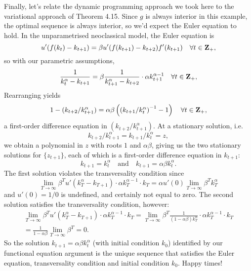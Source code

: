 \documentclass[11pt,letterpaper,reqno,oneside]{article}
\begin{document}
Finally, let's relate the dynamic programming approach we took here to the variational approach of Theorem 4.15. Since $g$ is always interior in this example, the optimal sequence is always interior, so we'd expect the Euler equation to hold. In the unparametrised neoclassical model, the Euler equation is
%
\begin{equation*}
	u'( f(k_t) - k_{t+1} ) 
	= \beta u'( f(k_{t+1}) - k_{t+2} ) f'(k_{t+1})
	\quad\forall t \in \mathbf{Z}_+ ,
\end{equation*}
%
so with our parametric assumptions,
%
\begin{equation*}
	\frac{1}{ k_t^\alpha - k_{t+1} }
	= \beta \frac{1}{ k_{t+1}^\alpha - k_{t+2} } 
	\cdot \alpha k_{t+1}^{\alpha-1}
	\quad\forall t \in \mathbf{Z}_+ ,
\end{equation*}
%
Rearranging yields
%
\begin{equation*}
	1 - (k_{t+2}/k_{t+1}^\alpha) 
	= \alpha \beta \left(
	\left( k_{t+1} / k_t^\alpha \right)^{-1} - 1 \right)
	\quad\forall t \in \mathbf{Z}_+ ,
\end{equation*}
%
a first-order difference equation in $\left( k_{t+2}/k_{t+1}^\alpha \right)$. At a stationary solution, i.e.
%
\begin{equation*}
	k_{t+2}/k_{t+1}^\alpha = k_{t+1} / k_t^\alpha = z ,
\end{equation*}
%
we obtain a polynomial in $z$ with roots $1$ and $\alpha \beta$, giving us the two stationary solutions for $\{z_{t+1}\}$, each of which is a first-order difference equation in $k_{t+1}$:
%
\begin{equation*}
	k_{t+1} = k_t^\alpha
	\quad\text{and}\quad
	k_{t+1} = \alpha \beta k_t^\alpha .
\end{equation*}
%
The first solution violates the transversality condition since
%
\begin{equation*}
	\lim_{T \to \infty} 
	\beta^T u'( k_T^\alpha - k_{T+1} ) 
	\cdot \alpha k_T^{\alpha-1}
	\cdot k_T 
	= \alpha u'( 0 ) \lim_{T \to \infty} 
	\beta^T k_T^\alpha
\end{equation*}
%
and $u'(0) = 1/0$ is undefined, and certainly not equal to zero. The second solution satisfies the transversality condition, however:
%
\begin{multline*}
	\lim_{T \to \infty} 
	\beta^T u'( k_T^\alpha - k_{T+1} ) 
	\cdot \alpha k_T^{\alpha-1}
	\cdot k_T 
	=
	\lim_{T \to \infty} 
	\beta^T \frac{1}{(1-\alpha\beta) k_T^\alpha} 
	\cdot \alpha k_T^{\alpha-1}
	\cdot k_T 
	\\
	=
	\frac{1}{1-\alpha\beta} \lim_{T \to \infty} 
	\beta^T
	= 0 .
\end{multline*}
%
So the solution $k_{t+1} = \alpha \beta k_t^\alpha$ (with initial condition $k_0$) identified by our functional equation argument is the unique sequence that satisfies the Euler equation, transversality condition and initial condition $k_0$. Happy times!
\end{document}
